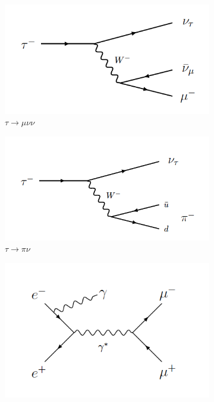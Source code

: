 \documentclass[12pt]{thesis}  %
\begin{document}
  \begin{figure}[h]
        \centering
        \begin{subfigure}[b]{0.315\textwidth}
            \centering
            \includegraphics[width=\textwidth]{images/taumununu.png}
            \caption[Network2]%
            {{\small $\tau\to \mu \nu \nu$}}    
            \label{fig:mean and std of net14}
        \end{subfigure}
        \hfill
        \begin{subfigure}[b]{0.315\textwidth}  
            \centering 
            \includegraphics[width=\textwidth]{images/taupinu.png}
            \caption[]%
            {{\small $\tau\to \pi \nu$}}    
            \label{fig:mean and std of net24}
        \end{subfigure}
                \hfill
        \begin{subfigure}[b]{0.315\textwidth}  
            \centering 
            \includegraphics[width=\textwidth]{images/eemumugamma.png}

\end{subfigure}
\end{figure}
\end{document}
